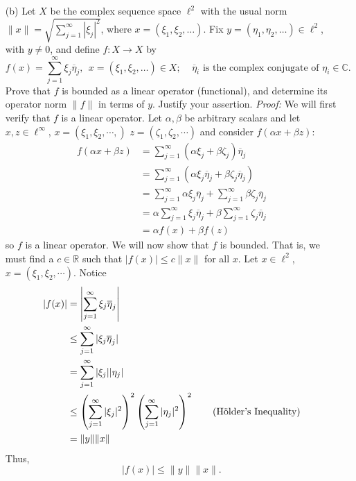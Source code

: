 \documentclass{article}
\begin{document}
\begin{itemize}
    \item[(b)] Let $X$ be the complex sequence space $\ell^2$ with the usual norm $\|x\| = \sqrt{\sum_{j=1}^{\infty} |\xi_j|^2}$, where $x = (\xi_1, \xi_2, \dots)$. Fix $y = (\eta_1, \eta_2, \dots) \in \ell^2$, with $y \neq 0$, and define $f : X \to X$ by 
    \[f(x) = \sum_{j=1}^{\infty}\xi_j\overline{\eta}_j, \:\: x = (\xi_1, \xi_2, \dots) \in X; \:\:\:\:\: \overline{\eta}_i \text{ is the complex conjugate of } \eta_i \in \mathbb{C}.\]
    Prove that $f$ is bounded as a linear operator (functional), and determine its operator norm $\|f\|$ in terms of $y$. Justify your assertion.
    \newline\newline
    \textit{Proof:} We will first verify that $f$ is a linear operator. Let $\alpha, \beta$ be arbitrary scalars and let $x, z \in \ell^{\infty}$, $x = (\xi_1, \xi_2, \cdots, )$ $z = (\zeta_1, \zeta_2, \cdots)$ and consider $f(\alpha x + \beta z)$:
    \begin{align*}
        f(\alpha x + \beta z) &= \sum_{j=1}^{\infty} (\alpha \xi_j + \beta \zeta_j)\overline{\eta}_j\\
        &= \sum_{j=1}^{\infty} (\alpha \xi_j \overline{\eta}_j + \beta \zeta_j \overline{\eta}_j)\\
        &= \sum_{j = 1}^{\infty} \alpha \xi_j \overline{\eta}_j + \sum_{j = 1}^{\infty} \beta \zeta_j \overline{\eta}_j\\
        &= \alpha \sum_{j = 1}^{\infty}\xi_j \overline{\eta}_j + \beta \sum_{j=1}^{\infty} \zeta_j\overline{\eta}_j\\
        &= \alpha f(x) + \beta f(z)
    \end{align*}
    so $f$ is a linear operator. We will now show that $f$ is bounded. That is, we must find a $c \in \mathbb{R}$ such that $|f(x)| \leq c\|x\|$ for all $x$. Let $x \in \ell^2$, $x = (\xi_1, \xi_2, \cdots)$. Notice
    \begin{align*}
        |f(x)| &= \left|\sum_{j = 1}^{\infty} \xi_j \overline{\eta}_j\right|\\
        &\leq \sum_{j=1}^{\infty} |\xi_j\overline{\eta}_j|\\
        &= \sum_{j=1}^{\infty} |\xi_j||\eta_j|\\
        &\leq \left(\sum_{j = 1}^{\infty} |\xi_j|^2\right)^2\left(\sum_{j = 1}^{\infty} |\eta_j|^2\right)^2 \tag*{(H{\"o}lder's Inequality)}\\
        &= \|y\|\|x\|
    \end{align*}
    Thus,
    \[|f(x)| \leq \|y\|\|x\|.\]

\end{itemize}
\end{document}
